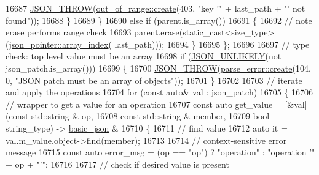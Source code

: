 \begin{DoxyCode}
16687                     \hyperlink{json_8hpp_a6c274f6db2e65c1b66c7d41b06ad690f}{JSON\_THROW}(\hyperlink{classnlohmann_1_1detail_1_1out__of__range_a3f6d82a6f967c4728a1ec735a7867073}{out\_of\_range::create}(403, \textcolor{stringliteral}{"key '"} + last\_path 
      + \textcolor{stringliteral}{"' not found"}));
16688                 \}
16689             \}
16690             \textcolor{keywordflow}{else} \textcolor{keywordflow}{if} (parent.is\_array())
16691             \{
16692                 \textcolor{comment}{// note erase performs range check}
16693                 parent.erase(static\_cast<size\_type>(\hyperlink{classnlohmann_1_1json__pointer_ac53f5b79dd91da78743c437832f57ce4}{json\_pointer::array\_index}(
      last\_path)));
16694             \}
16695         \};
16696 
16697         \textcolor{comment}{// type check: top level value must be an array}
16698         \textcolor{keywordflow}{if} (\hyperlink{json_8hpp_ab77582407c64944e7db1ea95ab520253}{JSON\_UNLIKELY}(not json\_patch.is\_array()))
16699         \{
16700             \hyperlink{json_8hpp_a6c274f6db2e65c1b66c7d41b06ad690f}{JSON\_THROW}(\hyperlink{classnlohmann_1_1detail_1_1parse__error_a9fd60ad6bce80fd99686ad332faefd37}{parse\_error::create}(104, 0, \textcolor{stringliteral}{"JSON patch must be an
       array of objects"}));
16701         \}
16702 
16703         \textcolor{comment}{// iterate and apply the operations}
16704         \textcolor{keywordflow}{for} (\textcolor{keyword}{const} \textcolor{keyword}{auto}& val : json\_patch)
16705         \{
16706             \textcolor{comment}{// wrapper to get a value for an operation}
16707             \textcolor{keyword}{const} \textcolor{keyword}{auto} get\_value = [&val](\textcolor{keyword}{const} std::string & op,
16708                                           \textcolor{keyword}{const} std::string & member,
16709                                           \textcolor{keywordtype}{bool} string\_type) -> \hyperlink{classnlohmann_1_1basic__json_aed115142bd0c6c66c864700e0467df55}{basic\_json} &
16710             \{
16711                 \textcolor{comment}{// find value}
16712                 \textcolor{keyword}{auto} it = val.m\_value.object->find(member);
16713 
16714                 \textcolor{comment}{// context-sensitive error message}
16715                 \textcolor{keyword}{const} \textcolor{keyword}{auto} error\_msg = (op == \textcolor{stringliteral}{"op"}) ? \textcolor{stringliteral}{"operation"} : \textcolor{stringliteral}{"operation '"} + op + \textcolor{stringliteral}{"'"};
16716 
16717                 \textcolor{comment}{// check if desired value is present}

\end{DoxyCode}

